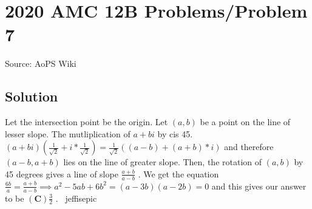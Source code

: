 \documentclass[12pt]{article}
\begin{document}
\section*{{2020 AMC 12B Problems/Problem 7}}
Source: AoPS Wiki

\subsection*{Solution}
Let the intersection point be the origin. Let $(a,b)$ be a point on the line of lesser slope. The mutliplication of $a+bi$ by cis 45. $(a+bi)(\frac{1}{\sqrt 2 }+i*\frac{1}{\sqrt 2 })=\frac{1}{\sqrt 2 }((a-b)+(a+b)*i)$ and therefore $(a-b, a+b)$ lies on the line of greater slope. Then, the rotation of $(a,b)$ by 45 degrees gives a line of slope $\frac{a+b}{a-b}$ . We get the equation $\frac{6b}{a}=\frac{a+b}{a-b}\implies a^2-5ab+6b^2=(a-3b)(a-2b)=0$ and this gives our answer to be $\mathbf{(C)} \frac{3}{2}$ . ~jeffisepic
\end{document}
